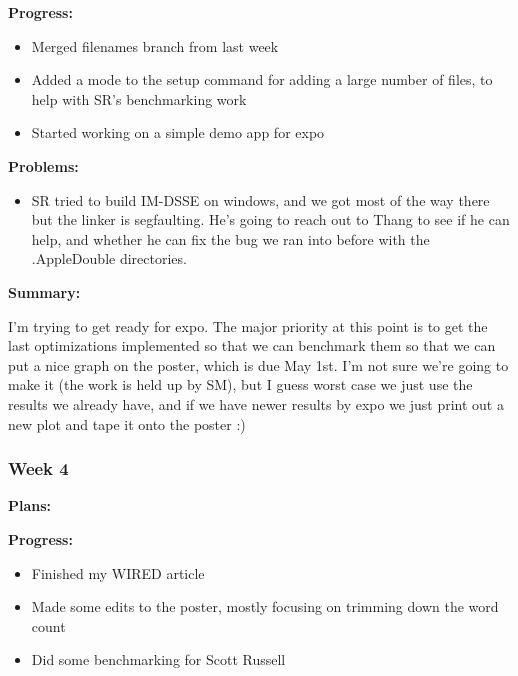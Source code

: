 \noindent \textbf{Progress: }

\begin{itemize}
\item     Merged filenames branch from last week

\item     Added a mode to the setup command for adding a large number of files, to help with SR's benchmarking work

\item     Started working on a simple demo app for expo
\end{itemize}

\noindent \textbf{Problems: }

\begin{itemize}
\item     SR tried to build IM-DSSE on windows, and we got most of the way there but the linker is segfaulting. He's going to reach out to Thang to see if he can help, and whether he can fix the bug we ran into before with the .AppleDouble directories.
\end{itemize}

\noindent \textbf{Summary: }

I'm trying to get ready for expo. The major priority at this point is to get the last optimizations implemented so that we can benchmark them so that we can put a nice graph on the poster, which is due May 1st. I'm not sure we're going to make it (the work is held up by SM), but I guess worst case we just use the results we already have, and if we have newer results by expo we just print out a new plot and tape it onto the poster :)


\subsubsection{Week 4}

\noindent \textbf{Plans: }

\noindent \textbf{Progress: }

\begin{itemize}
\item     Finished my WIRED article

\item     Made some edits to the poster, mostly focusing on trimming down the word count

\item     Did some benchmarking for Scott Russell
\end{itemize}

